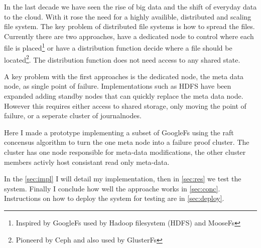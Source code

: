 In the last decade we have seen the rise of big data and the shift of everyday data to the cloud. With it rose the need for a highly availible, distributed and scaling file system. The key problem of distributed file systems is how to spread the files. Currently there are two approaches, have a dedicated node to control where each file is placed\footnote{Inspired by GoogleFs\cite{gfs} used by Hadoop filesystem\cite{hdfs} (HDFS) and MooseFs\cite{moosefs}} or have a distribution function decide where a file should be located\footnote{Pioneerd by Ceph\cite{ceph} and also used by GlusterFs\cite{glusterfs}}. The distribution function does not need access to any shared state.

A key problem with the first approaches is the dedicated node, the meta data node, as single point of failure. Implementations such as HDFS have been expanded adding standby nodes that can quickly replace the meta data node. However this requires either access to shared storage\cite{hdfs_ha_nfs}, only moving the point of failure, or a seperate cluster of journalnodes\cite{hdfs_ha_q}.

Here I made a prototype implementing a subset of GoogleFs using the raft\cite{raft} concensus algorithm to turn the one meta node into a failure proof cluster. The cluster has one node responsible for meta-data modifications, the other cluster members activly host consistant read only meta-data. 

In the \cref{sec:impl} I will detail my implementation, then in \cref{sec:res} we test the system. Finally I conclude how well the approache works in \cref{sec:conc}. Instructions on how to deploy the system for testing are in \cref{sec:deploy}.
